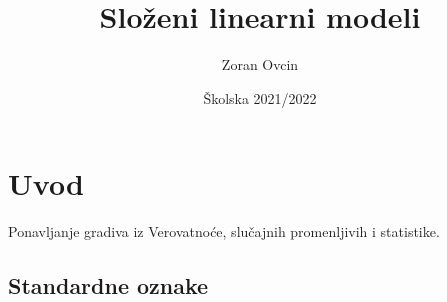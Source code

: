 \documentclass[twoside,titlepage,12pt,a4paper]{book}
\title{Složeni linearni modeli}
\author{Zoran Ovcin}
\date{Školska 2021/2022}
\numberwithin{equation}{chapter}
\begin{document}
%
%
\renewcommand\floatpagefraction{.9}
\renewcommand\topfraction{.9}
\renewcommand\bottomfraction{.9}
\renewcommand\textfraction{.1}
\setcounter{totalnumber}{50} \setcounter{topnumber}{50}
\setcounter{bottomnumber}{50}
%
%
%
%
%
%
%
%
%
\chapter{Uvod}

Ponavljanje gradiva iz Verovatnoće, slučajnih promenljivih i statistike.





\section{Standardne oznake}
\end{document}
